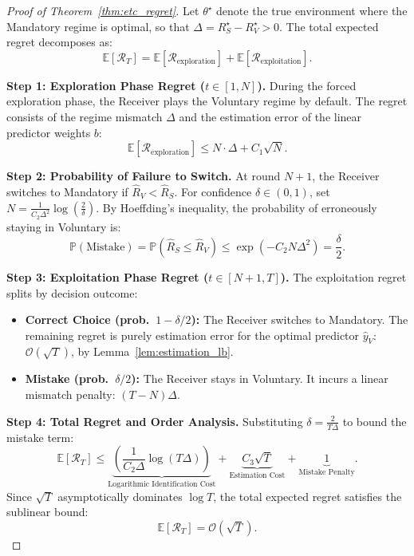 \begin{proof}[Proof of Theorem~\ref{thm:etc_regret}]
Let $\theta^\star$ denote the true environment where the Mandatory regime is optimal, so that $\Delta = R_S^\star - R_V^\star > 0$. The total expected regret decomposes as:
\begin{equation}
    \mathbb{E}[\mathcal{R}_T] = \mathbb{E}[\mathcal{R}_{\text{exploration}}] + \mathbb{E}[\mathcal{R}_{\text{exploitation}}].
\end{equation}

\textbf{Step 1: Exploration Phase Regret ($t \in [1, N]$).}
During the forced exploration phase, the Receiver plays the Voluntary regime by default. The regret consists of the regime mismatch $\Delta$ and the estimation error of the linear predictor weights $b$:
\begin{equation}
    \mathbb{E}[\mathcal{R}_{\text{exploration}}] \leq N \cdot \Delta + C_1\sqrt{N}.
\end{equation}

\textbf{Step 2: Probability of Failure to Switch.}
At round $N+1$, the Receiver switches to Mandatory if $\hat{R}_V < \hat{R}_S$. For confidence $\delta \in (0,1)$, set $N = \frac{1}{C_2 \Delta^2} \log\!\left(\frac{2}{\delta}\right)$. By Hoeffding's inequality, the probability of erroneously staying in Voluntary is:
\begin{equation}
    \mathbb{P}(\text{Mistake}) = \mathbb{P}(\hat{R}_S \le \hat{R}_V) \le \exp(-C_2 N \Delta^2) = \frac{\delta}{2}.
\end{equation}

\textbf{Step 3: Exploitation Phase Regret ($t \in [N+1, T]$).}
The exploitation regret splits by decision outcome:
\begin{itemize}
    \item \textbf{Correct Choice (prob.\ $1-\delta/2$):} The Receiver switches to Mandatory. The remaining regret is purely estimation error for the optimal predictor $\hat{y}_V$: $\mathcal{O}(\sqrt{T})$, by Lemma~\ref{lem:estimation_lb}.
    \item \textbf{Mistake (prob.\ $\delta/2$):} The Receiver stays in Voluntary. It incurs a linear mismatch penalty: $(T-N)\Delta$.
\end{itemize}

\textbf{Step 4: Total Regret and Order Analysis.}
Substituting $\delta = \frac{2}{T\Delta}$ to bound the mistake term:
\begin{equation}
    \mathbb{E}[\mathcal{R}_T] \le \underbrace{\left(\frac{1}{C_2 \Delta} \log(T\Delta)\right)}_{\text{Logarithmic Identification Cost}} + \underbrace{C_3\sqrt{T}}_{\text{Estimation Cost}} + \underbrace{1}_{\text{Mistake Penalty}}.
\end{equation}
Since $\sqrt{T}$ asymptotically dominates $\log T$, the total expected regret satisfies the sublinear bound:
\begin{equation}
    \mathbb{E}[\mathcal{R}_T] = \mathcal{O}(\sqrt{T}).
\end{equation}
\end{proof}
